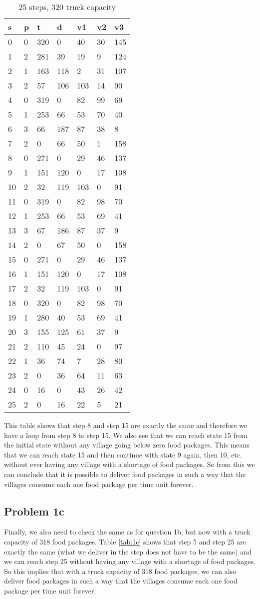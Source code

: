 \documentclass[a4paper]{article}
\begin{document}
	\begin{table}[!htb]
		\begin{longtable}[c]{@{}|l|l|l|l|l|l|l|@{}}
			\toprule
			s & p & t & d & v1 & v2 & v3\tabularnewline
			\midrule
			\endhead
			0 & 0 & 320 & 0 & 40 & 30 & 145\tabularnewline
			1 & 2 & 281 & 39 & 19 & 9 & 124\tabularnewline
			2 & 1 & 163 & 118 & 2 & 31 & 107\tabularnewline
			3 & 2 & 57 & 106 & 103 & 14 & 90\tabularnewline
			4 & 0 & 319 & 0 & 82 & 99 & 69\tabularnewline
			5 & 1 & 253 & 66 & 53 & 70 & 40\tabularnewline
			6 & 3 & 66 & 187 & 87 & 38 & 8\tabularnewline
			7 & 2 & 0 & 66 & 50 & 1 & 158\tabularnewline
			\rowcolor{Highlight}
			8 & 0 & 271 & 0 & 29 & 46 & 137\tabularnewline
			9 & 1 & 151 & 120 & 0 & 17 & 108\tabularnewline
			10 & 2 & 32 & 119 & 103 & 0 & 91\tabularnewline
			11 & 0 & 319 & 0 & 82 & 98 & 70\tabularnewline
			12 & 1 & 253 & 66 & 53 & 69 & 41\tabularnewline
			13 & 3 & 67 & 186 & 87 & 37 & 9\tabularnewline
			14 & 2 & 0 & 67 & 50 & 0 & 158\tabularnewline
			\rowcolor{Highlight}
			15 & 0 & 271 & 0 & 29 & 46 & 137\tabularnewline
			16 & 1 & 151 & 120 & 0 & 17 & 108\tabularnewline
			17 & 2 & 32 & 119 & 103 & 0 & 91\tabularnewline
			18 & 0 & 320 & 0 & 82 & 98 & 70\tabularnewline
			19 & 1 & 280 & 40 & 53 & 69 & 41\tabularnewline
			20 & 3 & 155 & 125 & 61 & 37 & 9\tabularnewline
			21 & 2 & 110 & 45 & 24 & 0 & 97\tabularnewline
			22 & 1 & 36 & 74 & 7 & 28 & 80\tabularnewline
			23 & 2 & 0 & 36 & 64 & 11 & 63\tabularnewline
			24 & 0 & 16 & 0 & 43 & 26 & 42\tabularnewline
			25 & 2 & 0 & 16 & 22 & 5 & 21\tabularnewline
			\bottomrule
		\end{longtable}
		\caption{25 steps, 320 truck capacity}
		\label{tab:1b}
	\end{table}
	
	This table shows that step 8 and step 15 are exactly the same and therefore we have a loop from step 8 to step 15. We also see that we can reach state 15 from the initial state without any village going below zero food packages. This means that we can reach state 15 and then continue with state 9 again, then 10, etc. without ever having any village with a shortage of food packages. So from this we can conclude that it is possible to deliver food packages in such a way that the villages consume each one food package per time unit forever.
	
	\subsection*{Problem 1c}
	Finally, we also need to check the same as for question 1b, but now with a truck capacity of 318 food packages. Table \ref{tab:1c} shows that step 5 and step 25 are exactly the same (what we deliver in the step does not have to be the same) and we can reach step 25 without having any village with a shortage of food packages. So this implies that with a truck capacity of 318 food packages, we can also deliver food packages in such a way that the villages consume each one food package per time unit forever.
	
\end{document}
